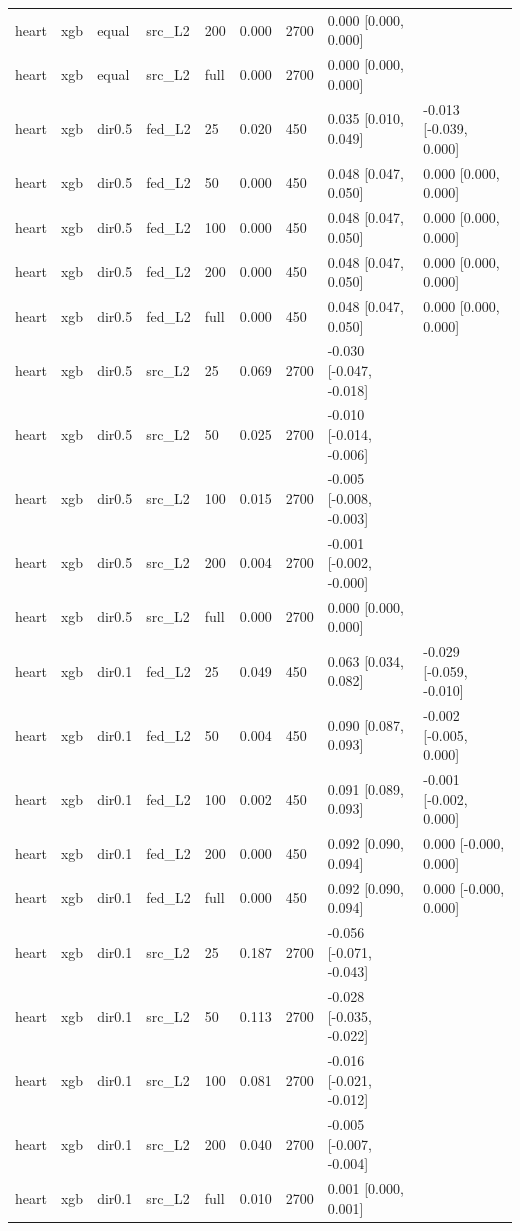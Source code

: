 \begin{tabular}{lllllllll}
heart & xgb & equal & src\_L2 & 200 & 0.000 & 2700 & 0.000 [0.000, 0.000] &  \\
heart & xgb & equal & src\_L2 & full & 0.000 & 2700 & 0.000 [0.000, 0.000] &  \\
heart & xgb & dir0.5 & fed\_L2 & 25 & 0.020 & 450 & 0.035 [0.010, 0.049] & -0.013 [-0.039, 0.000] \\
heart & xgb & dir0.5 & fed\_L2 & 50 & 0.000 & 450 & 0.048 [0.047, 0.050] & 0.000 [0.000, 0.000] \\
heart & xgb & dir0.5 & fed\_L2 & 100 & 0.000 & 450 & 0.048 [0.047, 0.050] & 0.000 [0.000, 0.000] \\
heart & xgb & dir0.5 & fed\_L2 & 200 & 0.000 & 450 & 0.048 [0.047, 0.050] & 0.000 [0.000, 0.000] \\
heart & xgb & dir0.5 & fed\_L2 & full & 0.000 & 450 & 0.048 [0.047, 0.050] & 0.000 [0.000, 0.000] \\
heart & xgb & dir0.5 & src\_L2 & 25 & 0.069 & 2700 & -0.030 [-0.047, -0.018] &  \\
heart & xgb & dir0.5 & src\_L2 & 50 & 0.025 & 2700 & -0.010 [-0.014, -0.006] &  \\
heart & xgb & dir0.5 & src\_L2 & 100 & 0.015 & 2700 & -0.005 [-0.008, -0.003] &  \\
heart & xgb & dir0.5 & src\_L2 & 200 & 0.004 & 2700 & -0.001 [-0.002, -0.000] &  \\
heart & xgb & dir0.5 & src\_L2 & full & 0.000 & 2700 & 0.000 [0.000, 0.000] &  \\
heart & xgb & dir0.1 & fed\_L2 & 25 & 0.049 & 450 & 0.063 [0.034, 0.082] & -0.029 [-0.059, -0.010] \\
heart & xgb & dir0.1 & fed\_L2 & 50 & 0.004 & 450 & 0.090 [0.087, 0.093] & -0.002 [-0.005, 0.000] \\
heart & xgb & dir0.1 & fed\_L2 & 100 & 0.002 & 450 & 0.091 [0.089, 0.093] & -0.001 [-0.002, 0.000] \\
heart & xgb & dir0.1 & fed\_L2 & 200 & 0.000 & 450 & 0.092 [0.090, 0.094] & 0.000 [-0.000, 0.000] \\
heart & xgb & dir0.1 & fed\_L2 & full & 0.000 & 450 & 0.092 [0.090, 0.094] & 0.000 [-0.000, 0.000] \\
heart & xgb & dir0.1 & src\_L2 & 25 & 0.187 & 2700 & -0.056 [-0.071, -0.043] &  \\
heart & xgb & dir0.1 & src\_L2 & 50 & 0.113 & 2700 & -0.028 [-0.035, -0.022] &  \\
heart & xgb & dir0.1 & src\_L2 & 100 & 0.081 & 2700 & -0.016 [-0.021, -0.012] &  \\
heart & xgb & dir0.1 & src\_L2 & 200 & 0.040 & 2700 & -0.005 [-0.007, -0.004] &  \\
heart & xgb & dir0.1 & src\_L2 & full & 0.010 & 2700 & 0.001 [0.000, 0.001] &  \\
\bottomrule
\end{tabular}
